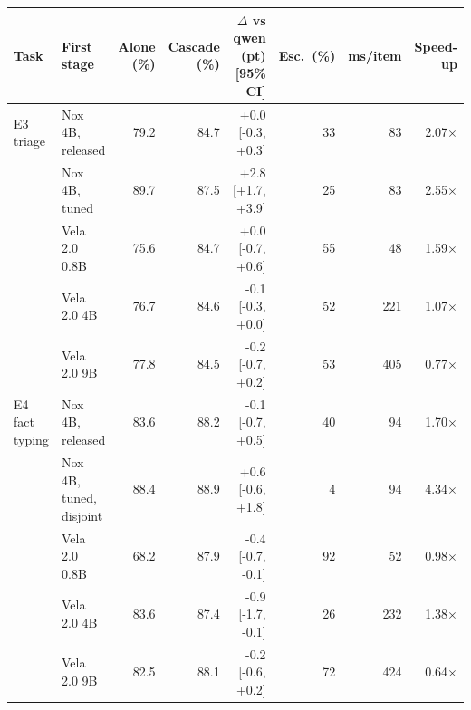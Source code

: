 \begin{tabular}{llrrrrrr}
\toprule
Task & First stage & Alone (\%) & Cascade (\%) & $\Delta$ vs qwen (pt) [95\% CI] & Esc.\ (\%) & ms/item & Speed-up \\
\midrule
E3 triage & Nox 4B, released & 79.2 & 84.7 & +0.0 [-0.3, +0.3] & 33 & 83 & 2.07$\times$ \\
 & Nox 4B, tuned & 89.7 & 87.5 & +2.8 [+1.7, +3.9] & 25 & 83 & 2.55$\times$ \\
 & Vela 2.0 0.8B & 75.6 & 84.7 & +0.0 [-0.7, +0.6] & 55 & 48 & 1.59$\times$ \\
 & Vela 2.0 4B & 76.7 & 84.6 & -0.1 [-0.3, +0.0] & 52 & 221 & 1.07$\times$ \\
 & Vela 2.0 9B & 77.8 & 84.5 & -0.2 [-0.7, +0.2] & 53 & 405 & 0.77$\times$ \\
\midrule
E4 fact typing & Nox 4B, released & 83.6 & 88.2 & -0.1 [-0.7, +0.5] & 40 & 94 & 1.70$\times$ \\
 & Nox 4B, tuned, disjoint & 88.4 & 88.9 & +0.6 [-0.6, +1.8] & 4 & 94 & 4.34$\times$ \\
 & Vela 2.0 0.8B & 68.2 & 87.9 & -0.4 [-0.7, -0.1] & 92 & 52 & 0.98$\times$ \\
 & Vela 2.0 4B & 83.6 & 87.4 & -0.9 [-1.7, -0.1] & 26 & 232 & 1.38$\times$ \\
 & Vela 2.0 9B & 82.5 & 88.1 & -0.2 [-0.6, +0.2] & 72 & 424 & 0.64$\times$ \\
\bottomrule
\end{tabular}
